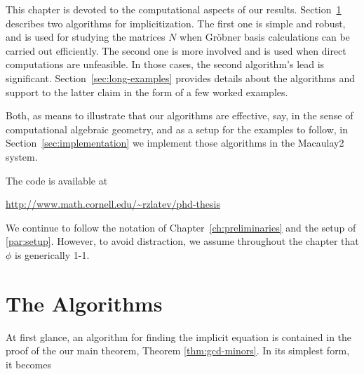 \documentclass[fleqn,reqno]{amsart}
\begin{document}



\begin{paragraf*}
This chapter is devoted to the computational aspects of our results.
Section~\ref{sec:algorithms} describes two algorithms for implicitization.
The first one is simple and robust, and is used for studying the matrices $N$
when Gr\"obner basis calculations can be carried out efficiently.
The second one is more involved and is used when direct computations are unfeasible.
In those cases, the second algorithm's lead is significant.
Section~\ref{sec:long-examples} provides details about the algorithms
and support to the latter claim in the form of a few worked examples.
\end{paragraf*}

\begin{paragraf*}
Both, as means to illustrate that our algorithms are effective, say,
in the sense of computational algebraic geometry,
and as a setup for the examples to follow,
in Section~\ref{sec:implementation} we implement those algorithms in
the Macaulay2 system.
\end{paragraf*}

\begin{paragraf*}
The code is available at
\begin{center}
	\url{http://www.math.cornell.edu/~rzlatev/phd-thesis}
\end{center}
\end{paragraf*}

\begin{paragraf*}
We continue to follow the notation of Chapter~\ref{ch:preliminaries}
and the setup of \eqref{par:setup}.
However, to avoid distraction,
we assume throughout the chapter that $\phi$ is generically 1-1.
\end{paragraf*}



\section{The Algorithms}
\label{sec:algorithms}

\begin{paragraf*}
At first glance, an algorithm for finding the implicit equation is contained in the proof
of the our main theorem, Theorem \ref{thm:gcd-minors}.
In its simplest form, it becomes
\end{paragraf*}
\end{document}

